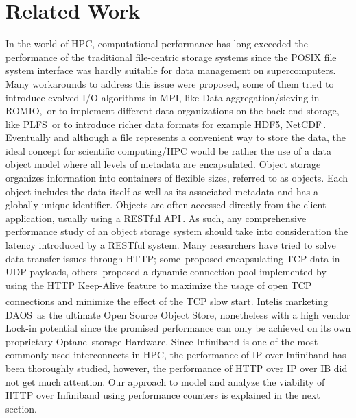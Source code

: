 \documentclass[runningheads]{llncs}
\begin{document}
\section {Related Work} \label{sec:related}

In the world of HPC, computational performance has long exceeded the performance of the traditional file-centric storage systems since the POSIX file system interface was hardly suitable for data management on supercomputers\cite{zadok2017posix}. Many workarounds to address this issue were proposed, some of them tried to introduce evolved I/O algorithms in MPI, like Data aggregation/sieving in ROMIO,\,\cite{datasievingromio} or to implement different data organizations on the back-end storage, like PLFS\,\cite{bent2009plfs} or to introduce richer data formats for example HDF5, NetCDF\,\cite{hdf5}.
Eventually and although a file represents a convenient way to store the data, the ideal concept for scientific computing/HPC would be rather the use of a data object model\cite{liu2018evaluation} where all levels of metadata are encapsulated. Object storage organizes information into containers of flexible sizes, referred to as objects. Each object includes the data itself as well as its associated metadata and has a globally unique identifier.
Objects are often accessed directly from the client application, usually using a RESTful API\,\cite{richardson2008restful}.
As such, any comprehensive performance study of an object storage system should take into consideration the latency introduced by a RESTful system.
Many researchers have tried to solve data transfer issues through HTTP; some\,\cite{forest} proposed encapsulating TCP data in UDP payloads, others\,\cite {Devresse} proposed a dynamic connection pool implemented by using the HTTP Keep-Alive feature to maximize the usage of open TCP connections and minimize the effect of the TCP slow start. Intel\textsuperscript \textregistered  is marketing DAOS\,\cite{DAOS} as the ultimate Open Source Object Store, nonetheless with a high vendor Lock-in potential since the promised performance can only be achieved on its own proprietary Optane\,\cite{Optane} storage Hardware.
Since Infiniband \cite{Infiniband} is one of the most commonly used interconnects in HPC, the performance of IP over Infiniband \cite{bortolotti2011comparison,grant2010study} has been thoroughly studied, however, the performance of HTTP over IP over IB did not get much attention. Our approach to model and analyze the viability of HTTP over Infiniband using performance counters is explained in the next section.
\end{document}
